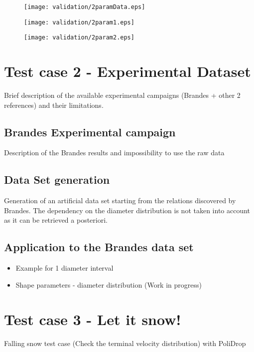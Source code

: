 		\begin{figure}
			\centering
			\texttt{[image: validation/2paramData.eps]}
			\caption{}
			\label{val: 2paramData}
		\end{figure}
		\begin{figure}
			\centering
			\texttt{[image: validation/2param1.eps]}
			\caption{}
			\label{val: 2param1}
		\end{figure}
		\begin{figure}
			\centering
			\texttt{[image: validation/2param2.eps]}
			\caption{}
			\label{val: 2param2}
		\end{figure}

	\section{Test case 2 - Experimental Dataset}
		Brief description of the available experimental campaigns (Brandes + other 2 references) and their limitations.
	
		\subsection{Brandes Experimental campaign}
		Description of the Brandes results and impossibility to use the raw data
		
		\subsection{Data Set generation}
		Generation of an artificial data set starting from the relations discovered by Brandes. The dependency on the diameter distribution is not taken into account as it can be retrieved a posteriori.
	
		\subsection{Application to the Brandes data set}
		\begin{itemize}
			\item Example for 1 diameter interval
			\item Shape parameters - diameter distribution (Work in progress)
		\end{itemize}
		
	\section{Test case 3 - Let it snow!}
		Falling snow test case (Check the terminal velocity distribution) with PoliDrop
